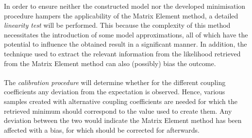 In order to ensure neither the constructed model nor the developed minimisation procedure hampers the applicability of the Matrix Element method, a detailed \textit{linearity test} will be performed.
This because the complexity of this method necessitates the introduction of some model approximations, all of which have the potential to influence the obtained result in a significant manner.
In addition, the technique used to extract the relevant information from the likelihood retrieved from the Matrix Element method can also (possibly) bias the outcome.
\\
\\
The \textit{calibration procedure} will determine whether for the different coupling coefficients any deviation from the expectation is observed.
Hence, various samples created with alternative coupling coefficients are needed for which the retrieved minimum should correspond to the value used to create them. Any deviation between the two would indicate the Matrix Element method has been affected with a bias, for which should be corrected for afterwards.
\\

